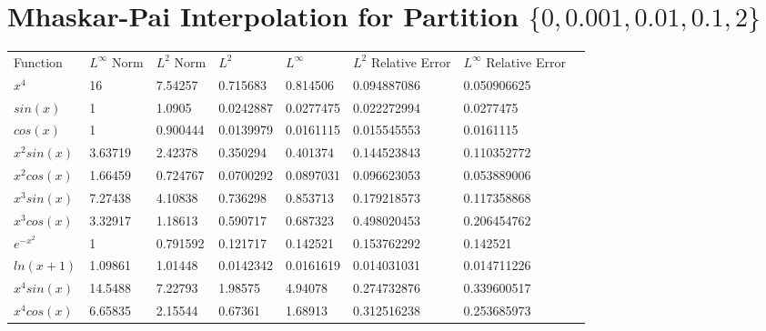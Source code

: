 \section{Mhaskar-Pai Interpolation for
\newline
Partition $\{0,0.001,0.01,0.1,2\}$}
\tiny{\begin{tabular}{llllllll}
Function   & $L^{\infty}$ Norm & $L^{2}$ Norm & $L^{2}$        & $L^{\infty}$   & $L^{2}$ Relative Error & $L^{\infty}$ Relative Error \\
%
$x^{4}$       &  16                            & 7.54257                  & 0.715683 & 0.814506 & 0.094887086         & 0.050906625              \\
$sin(x)$      &  1                             & 1.0905                   & 0.0242887 & 0.0277475 & 0.022272994         & 0.0277475              \\
$cos(x)$      &  1                             & 0.900444                 & 0.0139979 & 0.0161115 & 0.015545553         & 0.0161115              \\
$x^{2}sin(x)$ &  3.63719                       & 2.42378                  & 0.350294 & 0.401374 & 0.144523843         & 0.110352772              \\
$x^{2}cos(x)$ &  1.66459                       & 0.724767                 & 0.0700292 & 0.0897031 & 0.096623053         & 0.053889006             \\
$x^{3}sin(x)$ &  7.27438                       & 4.10838                  & 0.736298 & 0.853713 & 0.179218573         & 0.117358868              \\
$x^{3}cos(x)$ &  3.32917                       & 1.18613                  & 0.590717 & 0.687323 & 0.498020453         & 0.206454762             \\
$e^{-x^2}$    &  1                             & 0.791592                 & 0.121717 & 0.142521 & 0.153762292         & 0.142521              \\
$ln(x+1)$     & 1.09861                       & 1.01448                  & 0.0142342 & 0.0161619 & 0.014031031         & 0.014711226              \\
$x^{4}sin(x)$ & 14.5488                       & 7.22793                  & 1.98575  & 4.94078  & 0.274732876         & 0.339600517              \\
$x^{4}cos(x)$ & 6.65835                       & 2.15544                  & 0.67361 & 1.68913  & 0.312516238         & 0.253685973             
\end{tabular}}